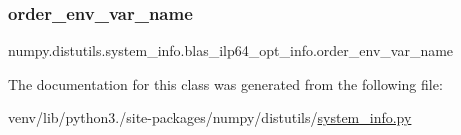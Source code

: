 \subsubsection{\texorpdfstring{order\+\_\+env\+\_\+var\+\_\+name}{order\_env\_var\_name}}
{\footnotesize\ttfamily numpy.\+distutils.\+system\+\_\+info.\+blas\+\_\+ilp64\+\_\+opt\+\_\+info.\+order\+\_\+env\+\_\+var\+\_\+name\hspace{0.3cm}{\ttfamily [static]}}



The documentation for this class was generated from the following file\+:\begin{DoxyCompactItemize}
\item 
venv/lib/python3./site-\/packages/numpy/distutils/\hyperlink{system__info_8py}{system\+\_\+info.\+py}\end{DoxyCompactItemize}

